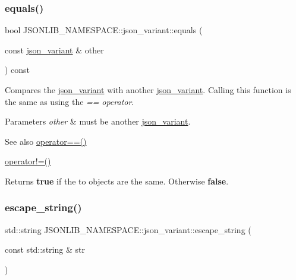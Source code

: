 \subsubsection{\texorpdfstring{equals()}{equals()}}
{\footnotesize\ttfamily bool J\+S\+O\+N\+L\+I\+B\+\_\+\+N\+A\+M\+E\+S\+P\+A\+C\+E\+::json\+\_\+variant\+::equals (\begin{DoxyParamCaption}\item[{const \hyperlink{classJSONLIB__NAMESPACE_1_1json__variant}{json\+\_\+variant} \&}]{other }\end{DoxyParamCaption}) const}



Compares the \hyperlink{classJSONLIB__NAMESPACE_1_1json__variant}{json\+\_\+variant} with another \hyperlink{classJSONLIB__NAMESPACE_1_1json__variant}{json\+\_\+variant}. Calling this function is the same as using the {\itshape ==} {\itshape operator}. 


\begin{DoxyParams}{Parameters}
{\em other} & must be another \hyperlink{classJSONLIB__NAMESPACE_1_1json__variant}{json\+\_\+variant}. \\
\hline
\end{DoxyParams}
\begin{DoxySeeAlso}{See also}
\hyperlink{classJSONLIB__NAMESPACE_1_1json__variant_aef1fc1a342cc170da06e0d3eb1299aad}{operator==()} 

\hyperlink{classJSONLIB__NAMESPACE_1_1json__variant_a7672a255983f3142523b3680e737d021}{operator!=()} 
\end{DoxySeeAlso}
\begin{DoxyReturn}{Returns}
{\bfseries true} if the to objects are the same. Otherwise {\bfseries false}. 
\end{DoxyReturn}
\mbox{\label{classJSONLIB__NAMESPACE_1_1json__variant_a4c2354098f97b91b5a07dbda981673cf}} 
\subsubsection{\texorpdfstring{escape\+\_\+string()}{escape\_string()}}
{\footnotesize\ttfamily std\+::string J\+S\+O\+N\+L\+I\+B\+\_\+\+N\+A\+M\+E\+S\+P\+A\+C\+E\+::json\+\_\+variant\+::escape\+\_\+string (\begin{DoxyParamCaption}\item[{const std\+::string \&}]{str }\end{DoxyParamCaption})\hspace{0.3cm}{\ttfamily [static]}}



